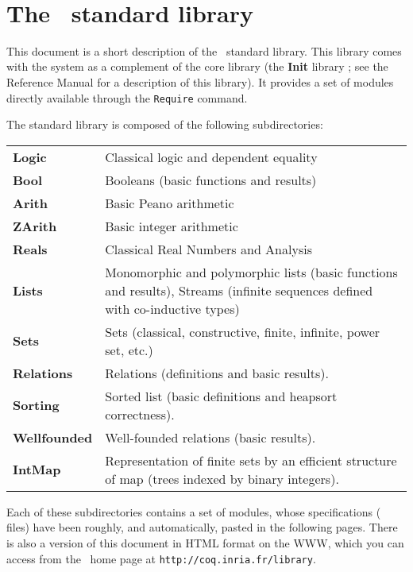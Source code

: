 \documentclass[11pt]{article}
\begin{document}
 
%
{\ }

\tableofcontents

\newpage
\section*{The \Coq\ standard library}

This document is a short description of the \Coq\ standard library.
This library comes with the system as a complement of the core library
(the {\bf Init} library ; see the Reference Manual for a description
of this library). It provides a set of modules directly available
through the \verb!Require! command.

The standard library is composed of the following subdirectories:

\medskip
\begin{tabular}{lp{12cm}}
  {\bf Logic}   & Classical logic and dependent equality \\
  {\bf Bool}    & Booleans (basic functions and results) \\
  {\bf Arith}   & Basic Peano arithmetic \\
  {\bf ZArith}  & Basic integer arithmetic \\
  {\bf Reals}   & Classical Real Numbers and Analysis \\
  {\bf Lists}   & Monomorphic and polymorphic lists (basic functions and
                  results), Streams (infinite sequences defined 
                  with co-inductive types) \\
  {\bf Sets}    & Sets (classical, constructive, finite, infinite, power set,
                  etc.) \\
  {\bf Relations}   & Relations (definitions and basic results). \\
  {\bf Sorting}  & Sorted list (basic definitions and heapsort correctness). \\
  {\bf Wellfounded} & Well-founded relations (basic results). \\
  {\bf IntMap}      & Representation of finite sets by an efficient
                      structure of map (trees indexed by binary integers).\\

\end{tabular}
\medskip

Each of these subdirectories contains a set of modules, whose
specifications (\gallina{} files) have
been roughly, and automatically, pasted in the following pages. There
is also a version of this document in HTML format on the WWW, which
you can access from the \Coq\ home page at
\texttt{http://coq.inria.fr/library}.


\end{document}
